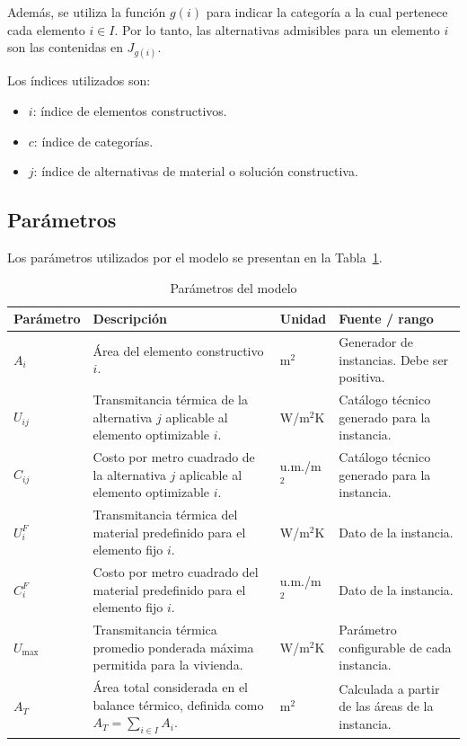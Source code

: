 \documentclass[journal, 12pt, onecolumn]{IEEEtran}
\begin{document}
Además, se utiliza la función $g(i)$ para indicar la categoría a la cual
pertenece cada elemento $i \in I$. Por lo tanto, las alternativas admisibles
para un elemento $i$ son las contenidas en $J_{g(i)}$.

Los índices utilizados son:

\begin{itemize}
    \item $i$: índice de elementos constructivos.
    \item $c$: índice de categorías.
    \item $j$: índice de alternativas de material o solución constructiva.
\end{itemize}

\subsection{Parámetros}

Los parámetros utilizados por el modelo se presentan en la
Tabla~\ref{tab:parametros}.

\begin{table}[h]
\centering
\caption{Parámetros del modelo}
\label{tab:parametros}
\begin{tabular}{|p{2.2cm}|p{5.3cm}|p{2.3cm}|p{3.2cm}|}
\hline
\textbf{Parámetro} & \textbf{Descripción} & \textbf{Unidad} & \textbf{Fuente / rango} \\ \hline
$A_i$ & Área del elemento constructivo $i$. & m$^2$ & Generador de instancias. Debe ser positiva. \\ \hline
$U_{ij}$ & Transmitancia térmica de la alternativa $j$ aplicable al elemento optimizable $i$. & W/m$^2$K & Catálogo técnico generado para la instancia. \\ \hline
$C_{ij}$ & Costo por metro cuadrado de la alternativa $j$ aplicable al elemento optimizable $i$. & u.m./m$^2$ & Catálogo técnico generado para la instancia. \\ \hline
$U_i^{F}$ & Transmitancia térmica del material predefinido para el elemento fijo $i$. & W/m$^2$K & Dato de la instancia. \\ \hline
$C_i^{F}$ & Costo por metro cuadrado del material predefinido para el elemento fijo $i$. & u.m./m$^2$ & Dato de la instancia. \\ \hline
$U_{\max}$ & Transmitancia térmica promedio ponderada máxima permitida para la vivienda. & W/m$^2$K & Parámetro configurable de cada instancia. \\ \hline
$A_T$ & Área total considerada en el balance térmico, definida como $A_T=\sum_{i\in I}A_i$. & m$^2$ & Calculada a partir de las áreas de la instancia. \\ \hline
\end{tabular}
\end{table}
\end{document}
